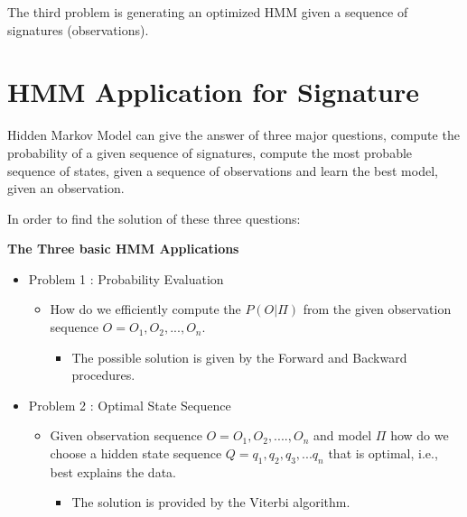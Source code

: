 \begin{tcolorbox}[width=\textwidth,colback={gray},title={Learning },colbacktitle=gray,coltitle=black]  

The third problem is generating an optimized HMM given a sequence of signatures (observations).
\end{tcolorbox}



\section{HMM Application for Signature}

Hidden Markov Model can give the answer of three major questions, compute the probability of a given sequence of signatures, compute the most probable sequence of states, given a sequence of observations and learn the best model, given an observation.

In order to find the solution of these three questions:


\textbf{The Three basic HMM Applications}

\begin{itemize}
\item Problem 1 : Probability Evaluation
 \begin{itemize}
 \item How do we efficiently compute the $P(O|\Pi)$ from the given observation sequence $O = {O_1, O_2,...,O_n}$.
 
  \begin{itemize}
  \item The possible solution is given by the Forward and Backward procedures.
  \end{itemize}
 \end{itemize}
\end{itemize}

\begin{itemize}
\item Problem 2 : Optimal State Sequence
 \begin{itemize}
 \item Given observation sequence $O = {O_1, O_2,....,}O_n$ and model $\Pi$ how do we choose a hidden state sequence $Q={q_1,q_2,q_3,...q_n}$
that is optimal, i.e., best explains the data. 
  \begin{itemize}
  \item The solution is provided by the Viterbi algorithm.
  \end{itemize}
 \end{itemize}
\end{itemize}



